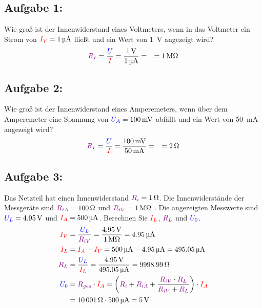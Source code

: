 \documentclass[11pt,a4paper,titlepage]{scrreprt}
\begin{document}
           \subsection{Aufgabe 1:} Wie groß ist der Innenwiderstand eines Voltmeters, wenn in das Voltmeter ein Strom von $\textcolor{red}{I_V} = \SI{1}{\micro\ampere}$ fließt und ein Wert von \SI{1}{\volt} angezeigt wird?
           \begin{align*}
               \textcolor{violet}{R_I} &= \frac{\textcolor{blue}{U}}{\textcolor{red}{I}} = \frac{\SI{1}{\volt}}{\SI{1}{\micro\ampere}} = 
               &= \SI{1}{\mega\ohm}
           \end{align*}
           \subsection{Aufgabe 2:} Wie groß ist der Innenwiderstand eines Amperemeters, wenn über dem Amperemeter eine Spannung von $\textcolor{blue}{U_A} = \SI{100}{\milli\volt}$ abfällt und ein Wert von \SI{50}{\milli\ampere} angezeigt wird?
           \begin{align*}
           \textcolor{violet}{R_I} &= \frac{\textcolor{blue}{U}}{\textcolor{red}{I}} = \frac{\SI{100}{\milli\volt}}{\SI{50}{\milli\ampere}} = 
           &= \SI{2}{\ohm}
           \end{align*}
           \subsection{Aufgabe 3:}  Das Netzteil hat einen Innenwiderstand $\textcolor{violet}{R_i} = \SI{1}{\ohm}$. Die Innenwiderstände der Messgeräte sind $\textcolor{violet}{R_{iA}} = \SI{100}{\ohm}$ und $\textcolor{violet}{R_{iV}} = \SI{1}{\mega\ohm}$ . Die angezeigten Messwerte sind $\textcolor{blue}{U_L} = \SI{4,95}{\volt}$ und $\textcolor{red}{I_A} = \SI{500}{\micro\ampere}$.  Berechnen Sie $\textcolor{red}{I_L}$, $\textcolor{violet}{R_L}$ und $\textcolor{blue}{U_0}$.
           \begin{align*}
               \textcolor{red}{I_V} &= \frac{\textcolor{blue}{U_L}}{\textcolor{violet}{R_{iV}}} = \frac{\SI{4,95}{\volt}}{\SI{1}{\mega\ohm}} = \SI{4,95}{\micro\ampere}\\
               \textcolor{red}{I_L} &= \textcolor{red}{I_A} - \textcolor{red}{I_V} = \SI{500}{\micro\ampere} - \SI{4,95}{\micro\ampere} = \SI{495,05}{\micro\ampere}\\
               \textcolor{violet}{R_L} &= \frac{\textcolor{blue}{U_L}}{\textcolor{red}{I_L}} = \frac{\SI{4,95}{\volt}}{\SI{495,05}{\micro\ampere}} = \SI{9998,99}{\ohm}\\
               \textcolor{blue}{U_0} &= \textcolor{violet}{R_{ges}} \cdot \textcolor{red}{I_A} = \left(\textcolor{violet}{R_i} + \textcolor{violet}{R_{iA}} + \frac{\textcolor{violet}{R_{iV}} \cdot \textcolor{violet}{R_L}}{\textcolor{violet}{R_{iV}} + \textcolor{violet}{R_L}}\right) \cdot \textcolor{red}{I_A}\\
               &= \SI{10001}{\ohm} \cdot \SI{500}{\micro\ampere} = \SI{5}{\volt}
           \end{align*}
\end{document}

